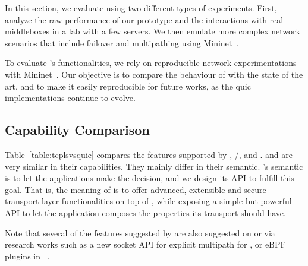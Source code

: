 
In this section, we evaluate \tcpls using two different types of experiments. First, analyze the raw performance of our \tcpls prototype and the interactions with real middleboxes in a lab with a few servers. We then emulate more complex network scenarios that include failover and multipathing using Mininet~\cite{handigol2012reproducible}. 




To evaluate \tcpls's functionalities, we rely on reproducible network
experimentations with Mininet~\cite{mininet}. Our objective is to compare the
behaviour of \tcpls with the state of the art, and to make it easily
reproducible for future works, as the quic implementations continue to evolve.

\subsection{Capability Comparison}

Table~\ref{table:tcplsvsquic} compares the features supported by
\tcp, \tls/\tcp, \quic and \tcpls. \quic and \tcpls are very similar in their
capabilities. They mainly differ in their semantic. \tcpls's semantic is to let
the applications make the decision, and we design its API to fulfill this goal.
That is, the meaning of \tcpls is to offer advanced, extensible and secure
transport-layer functionalities on top of \tcp, while exposing a simple but
powerful API to let the application composes the properties its transport should
have.

Note that several of the features suggested by \tcpls are also suggested on \tcp or \quic via research works such as a new socket API for explicit multipath for \tcp\cite{hesmans2016enhanced}, or eBPF plugins in
\quic~\cite{de2019pluginizing}.

